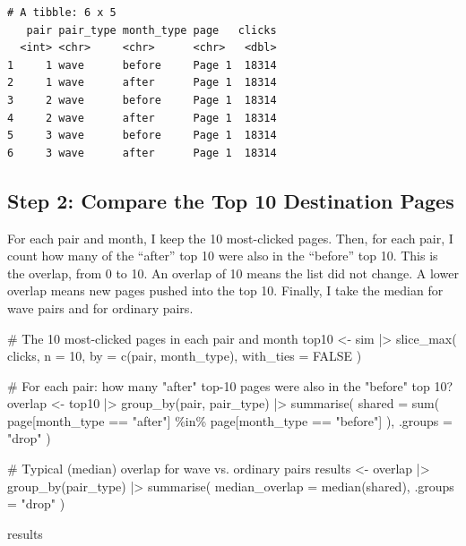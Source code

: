 \documentclass[
  9pt,
  letterpaper,
  DIV=11,
  numbers=noendperiod]{scrartcl}
\newenvironment{Shaded}{\begin{snugshade}}{\end{snugshade}}
\newcommand{\AttributeTok}[1]{\textcolor[rgb]{0.40,0.45,0.13}{#1}}
\newcommand{\CommentTok}[1]{\textcolor[rgb]{0.37,0.37,0.37}{#1}}
\newcommand{\ConstantTok}[1]{\textcolor[rgb]{0.56,0.35,0.01}{#1}}
\newcommand{\DecValTok}[1]{\textcolor[rgb]{0.68,0.00,0.00}{#1}}
\newcommand{\FunctionTok}[1]{\textcolor[rgb]{0.28,0.35,0.67}{#1}}
\newcommand{\NormalTok}[1]{\textcolor[rgb]{0.00,0.23,0.31}{#1}}
\newcommand{\OtherTok}[1]{\textcolor[rgb]{0.00,0.23,0.31}{#1}}
\newcommand{\SpecialCharTok}[1]{\textcolor[rgb]{0.37,0.37,0.37}{#1}}
\newcommand{\StringTok}[1]{\textcolor[rgb]{0.13,0.47,0.30}{#1}}
\begin{document}
\begin{verbatim}
# A tibble: 6 x 5
   pair pair_type month_type page   clicks
  <int> <chr>     <chr>      <chr>   <dbl>
1     1 wave      before     Page 1  18314
2     1 wave      after      Page 1  18314
3     2 wave      before     Page 1  18314
4     2 wave      after      Page 1  18314
5     3 wave      before     Page 1  18314
6     3 wave      after      Page 1  18314
\end{verbatim}

\subsection{Step 2: Compare the Top 10 Destination
Pages}\label{step-2-compare-the-top-10-destination-pages}

For each pair and month, I keep the 10 most-clicked pages. Then, for
each pair, I count how many of the ``after'' top 10 were also in the
``before'' top 10. This is the overlap, from 0 to 10. An overlap of 10
means the list did not change. A lower overlap means new pages pushed
into the top 10. Finally, I take the median for wave pairs and for
ordinary pairs.

\begin{Shaded}
\begin{Highlighting}[]
\CommentTok{\# The 10 most{-}clicked pages in each pair and month}
\NormalTok{top10 }\OtherTok{\textless{}{-}}\NormalTok{ sim }\SpecialCharTok{|\textgreater{}}
  \FunctionTok{slice\_max}\NormalTok{(}
\NormalTok{    clicks,}
    \AttributeTok{n =} \DecValTok{10}\NormalTok{,}
    \AttributeTok{by =} \FunctionTok{c}\NormalTok{(pair, month\_type),}
    \AttributeTok{with\_ties =} \ConstantTok{FALSE}
\NormalTok{  )}

\CommentTok{\# For each pair: how many "after" top{-}10 pages were also in the "before" top 10?}
\NormalTok{overlap }\OtherTok{\textless{}{-}}\NormalTok{ top10 }\SpecialCharTok{|\textgreater{}}
  \FunctionTok{group\_by}\NormalTok{(pair, pair\_type) }\SpecialCharTok{|\textgreater{}}
  \FunctionTok{summarise}\NormalTok{(}
    \AttributeTok{shared =} \FunctionTok{sum}\NormalTok{(}
\NormalTok{      page[month\_type }\SpecialCharTok{==} \StringTok{"after"}\NormalTok{] }\SpecialCharTok{\%in\%}
\NormalTok{        page[month\_type }\SpecialCharTok{==} \StringTok{"before"}\NormalTok{]}
\NormalTok{    ),}
    \AttributeTok{.groups =} \StringTok{"drop"}
\NormalTok{  )}

\CommentTok{\# Typical (median) overlap for wave vs. ordinary pairs}
\NormalTok{results }\OtherTok{\textless{}{-}}\NormalTok{ overlap }\SpecialCharTok{|\textgreater{}}
  \FunctionTok{group\_by}\NormalTok{(pair\_type) }\SpecialCharTok{|\textgreater{}}
  \FunctionTok{summarise}\NormalTok{(}
    \AttributeTok{median\_overlap =} \FunctionTok{median}\NormalTok{(shared),}
    \AttributeTok{.groups =} \StringTok{"drop"}
\NormalTok{  )}

\NormalTok{results}
\end{Highlighting}
\end{Shaded}
\end{document}
